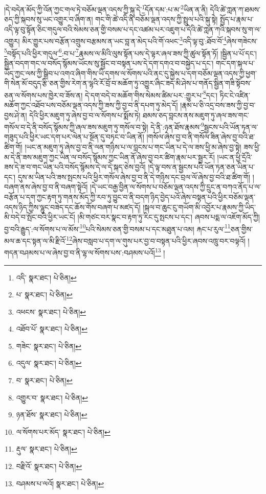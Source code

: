 །དེ་བདེན་མོད་ཀྱི་འོན་ཀྱང་གལ་ཏེ་བཅོམ་ལྡན་འདས་ཀྱི་སྐུ་དེ་\footnote{འདི་  སྣར་ཐང་།  པེ་ཅིན། }དོན་དམ་:པ་མ་\footnote{པ་  སྣར་ཐང་།  པེ་ཅིན། }ཡིན་ན་ནི། དེའི་ཚེ་ཀླན་ཀ་ཐམས་ཅད་ཀྱི་སྐབས་སུ་ཡང་འགྱུར་བ་ཞིག་ན། གང་གི་ཚེ་འདི་ནི་བཅོམ་ལྡན་འདས་ཀྱི་སྤྲུལ་པའི་སྐུ་སྟེ། སྤྱོད་པ་རྣམ་པ་འདི་ལྟ་བུ་སྟོན་ཅིང་གདུལ་བའི་སེམས་ཅན་གྱི་བསམ་པ་དང་འཚམ་པར་འཇུག་པ་དེའི་ཚེ་ཀླན་ཀའི་སྐབས་སུ་ག་ལ་འགྱུར། མིར་གྱུར་པས་བརྩོན་འགྲུས་བརྩམས་ན་ཡང་བླ་ན་མེད་པའི་གོ་འཕང་\footnote{འཕངས་  སྣར་ཐང་།  པེ་ཅིན། }འདི་ལྟ་བུ་:ཐོབ་བོ་\footnote{འཐོབ་པོ་  སྣར་ཐང་།  པེ་ཅིན། }ཞེས་གཟེངས་\footnote{གཟེང་  སྣར་ཐང་།  པེ་ཅིན། }བསྟོད་པའི་ཕྱིར་གདུལ་\footnote{འདུལ་  སྣར་ཐང་།  པེ་ཅིན། }:བ་པ་\footnote{བ་  སྣར་ཐང་།  པེ་ཅིན། }རྣམས་ལ་མིའི་ལུས་སྟོན་པས་དེ་ལྟར་ཞལ་ཟས་ཀྱི་ཚུལ་སྟོན་ཏོ། །སྦྱིན་པ་པོ་དང་། སྦྱིན་བདག་གང་ལ་བསོད་སྙོམས་ཡོངས་སུ་སྦྱོང་བ་བསྟན་པས་དེ་དག་དགའ་བ་བསྐྱེད་པ་དང་། གང་དག་སྐལ་པ་ཡོད་ཀྱང་ལས་ཀྱི་སྒྲིབ་པ་འགའ་ཞིག་གིས་ཡི་དགས་ལ་སོགས་པའི་ནང་དུ་སྐྱེས་པ་དག་བཅོམ་ལྡན་འདས་ཀྱི་ཕྱག་གི་སེན་མོ་བདུད་རྩི་ཅན་གྱིས་རེག་ན་ལྷའི་རོ་བྲོ་བ་མཆོག་ཏུ་འགྱུར་ཞིང་ཟད་མི་ཤེས་པ་གནོད་སྦྱིན་གཟི་སྟོབས་ཅན་ལ་སོགས་པས་ཁྱེར་བ་ཟོས་ན། དེ་དག་བདེ་བ་མཆོག་གིས་སེམས་ཚིམ་པར་:གྱུར་པ་\footnote{འགྱུར་བ་  སྣར་ཐང་།  པེ་ཅིན། }དང་། ཏིང་ངེ་འཛིན་མཆོག་ཀྱང་འཐོབ་པས་བཅོམ་ལྡན་འདས་ཀྱི་ཟས་ཀྱི་བྱ་བ་ནི་དཔག་ཏུ་མེད་དོ། །རྣམ་པ་ཅི་འདྲ་བས་ཟས་ཀྱི་བྱ་བ་བྱས་ཤེ་ན། དེའི་ཕྱིར་མཇུག་ཏུ་ཞེས་བྱ་བ་ལ་སོགས་པ་སྨོས་ཏེ། ཐམས་ཅད་བླངས་ནས་མཇུག་ཏུ་ཞལ་ཟས་གང་གསོལ་བ་དེ་ནི་བསོད་སྙོམས་ཀྱི་ཞལ་ཟས་མཇུག་ཏུ་གསོལ་བ་སྟེ། དེ་ནི་:ཉན་ཐོས་རྣམས་\footnote{ཉན་ཐོས་  སྣར་ཐང་།  པེ་ཅིན། }སྦྱངས་པའི་ཡོན་ཏན་ལ་གཟུད་པའི་ཕྱིར་ཡང་དག་པར་ལེན་པ་སྔོན་དུ་བཏང་བ་ཡིན་ནོ། །གསོལ་ཞེས་བྱ་བ་ནི་གསོལ་ཟིན་ཞེས་བྱ་བའི་ཐ་ཚིག་གོ། །ཡང་ན་མཇུག་ཏུ་ཞེས་བྱ་བ་ནི་ལན་གཉིས་པ་ལ་བླངས་པ་གང་ཡིན་པ་དེ་ལ་ཟས་ཕྱི་མ་ཞེས་བྱ་སྟེ། ཟས་ཕྱི་མ་དེ་ནི་ཟས་མཇུག་ཀྱང་ཡིན་ལ་བསོད་སྙོམས་ཀྱང་ཡིན་ནོ་ཞེས་བྱ་བར་ཚིག་རྣམ་པར་སྦྱར་རོ། །ཡང་ན་ཕྱི་དྲོའི་ཟས་དེ་ཟ་བ་གང་ཡིན་པའི་བསོད་སྙོམས་དེ་ལ་དེ་སྐད་ཅེས་བྱའོ། །དེ་ལྟ་བས་ན་སྦྱངས་པའི་ཡོན་ཏན་ཅན་ཡིན་པ་དང་། དུས་མ་ཡིན་པའི་ཟས་སྤངས་པའི་ཕྱིར་གསོལ་ཞེས་བྱ་བ་ནི་དེ་གཉིས་དང་བྲལ་ལོ་ཞེས་བྱ་བའི་ཐ་ཚིག་གོ། །བཞག་ནས་ཞེས་བྱ་བ་ནི་བཞག་སྟེའོ། །དེ་ཡང་བརྒྱ་བྱིན་ལ་སོགས་པ་བཅོམ་ལྡན་འདས་ཀྱི་དྲུང་ན་བཀའ་ནོད་པ་ལ་བརྩོན་པ་དག་ཀྱང་རྟག་ཏུ་གནས་མོད་ཀྱི་རབ་ཏུ་བྱུང་བ་ནི་བདག་ཉིད་བྱེད་པའོ་ཞེས་བསྟན་པའི་ཕྱིར་བཅོམ་ལྡན་འདས་ཉིད་ཀྱིས་ལྷུང་བཟེད་དང་ཆོས་གོས་བཞག་པ་མཛད་དོ། །སྐལ་བ་ཆུང་ངུ་གཡོག་མི་འབྱོར་པ་རྣམས་ཀྱི་ཡིད་མི་བདེ་བ་སྤོང་བའི་ཕྱིར་ཡང་ངོ། །མི་གཙང་བར་སྣང་བ་རྟག་ཏུ་རིང་དུ་སྤངས་པ་དང་། ཞབས་པདྨ་ལ་འཇོག་མོད་ཀྱི། བྱ་བའི་རྒྱུད་:ལ་སོགས་པ་ལ་མོས་\footnote{ལ་སོགས་པར་མོད་  སྣར་ཐང་།  པེ་ཅིན། }པའི་སེམས་ཅན་གྱི་བསམ་པ་དང་མཐུན་པ་འམ། རྐང་པ་རུལ་\footnote{རྡུལ་  སྣར་ཐང་།  པེ་ཅིན། }ཅན་གྱིས་མལ་ཆ་དང་སྟན་ལ་མི་རྫིའོ་\footnote{བརྫིའོ་  སྣར་ཐང་།  པེ་ཅིན། }ཞེས་བསླབ་པ་དག་ལ་གུས་པར་བྱ་བ་བསྟན་པའི་ཕྱིར་ཞབས་འཁྲུ་བར་བལྟའོ། །གདན་བཤམས་པ་ལ་ཞེས་བྱ་བ་ནི་ལྷ་ལ་སོགས་པས་:བཤམས་པའོ།\footnote{བཤམས་པ་ལའོ།  སྣར་ཐང་།  པེ་ཅིན། } །
